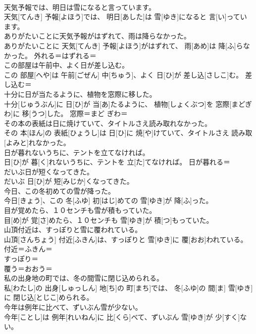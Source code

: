 \documentclass[8pt]{extreport}
\begin{document}
\begin{CJK}{UTF8}{min}
\\	天気予報では、明日は雪になると言っています。	
\\	天気[てんき] 予報[よほう]では、 明日[あした]は 雪[ゆき]になると 言[い]っています。	
\\	ありがたいことに天気予報がはずれて、雨は降らなかった。	
\\	ありがたいことに 天気[てんき] 予報[よほう]がはずれて、 雨[あめ]は 降[ふ]らなかった。	外れる＝はずれる＝ 
\\	この部屋は午前中、よく日が差し込む。	
\\	この 部屋[へや]は 午前[ごぜん] 中[ちゅう]、よく 日[ひ]が 差し込[さしこ]む。	差し込む＝ 
\\	十分に日が当たるように、植物を窓際に移した。	
\\	十分[じゅうぶん]に 日[ひ]が 当[あ]たるように、 植物[しょくぶつ]を 窓際[まどぎわ]に 移[うつ]した。	窓際＝まど ぎわ＝ 
\\	その本の表紙は日に焼けていて、タイトルさえ読み取れなかった。	
\\	その 本[ほん]の 表紙[ひょうし]は 日[ひ]に 焼[や]けていて、タイトルさえ 読み取[よみと]れなかった。	
\\	日が暮れないうちに、テントを立てなければ。	
\\	日[ひ]が 暮[く]れないうちに、テントを 立[た]てなければ。	日が暮れる＝ 
\\	だいぶ日が短くなってきた。	
\\	だいぶ 日[ひ]が 短[みじか]くなってきた。	
\\	今日、この冬初めての雪が降った。	
\\	今日[きょう]、この 冬[ふゆ] 初[はじ]めての 雪[ゆき]が 降[ふ]った。	
\\	目が覚めたら、１０センチも雪が積もっていた。	
\\	目[め]が 覚[さ]めたら、１０センチも 雪[ゆき]が 積[つ]もっていた。	
\\	山頂付近は、すっぽりと雪に覆われている。	
\\	山頂[さんちょう] 付近[ふきん]は、すっぽりと 雪[ゆき]に 覆[おお]われている。	付近＝ふきん＝ 
\\	すっぽり＝ 
\\	覆う＝おおう＝ 
\\	私の出身地の町では、冬の間雪に閉じ込められる。	
\\	私[わたし]の 出身[しゅっしん] 地[ち]の 町[まち]では、 冬[ふゆ]の 間[ま] 雪[ゆき]に 閉じ込[とじこ]められる。	
\\	今年は例年に比べて、ずいぶん雪が少ない。	
\\	今年[ことし]は 例年[れいねん]に 比[くら]べて、ずいぶん 雪[ゆき]が 少[すく]ない。	

\end{CJK}
\end{document}
